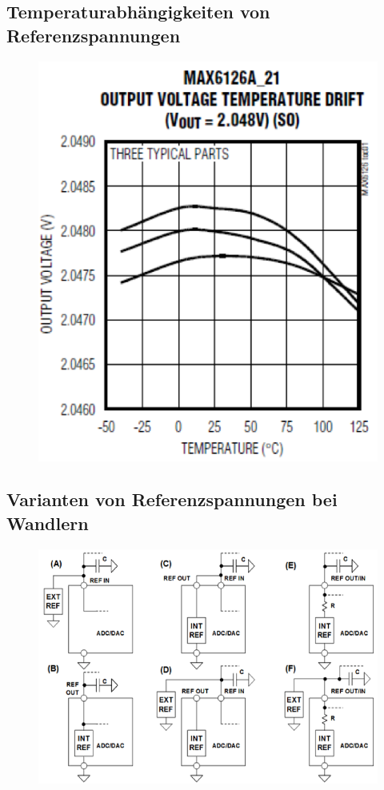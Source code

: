 \subsection{Temperaturabhängigkeiten von Referenzspannungen}
\begin{figure}[!htbp]
\includegraphics[scale=0.5]{pictures/temperaturabhaengigkeit}
\end{figure}
\subsection{Varianten von Referenzspannungen bei Wandlern}
\begin{figure}[!htbp]
\includegraphics[scale=0.5]{pictures/variantenReferenzspannungen}
\end{figure}

